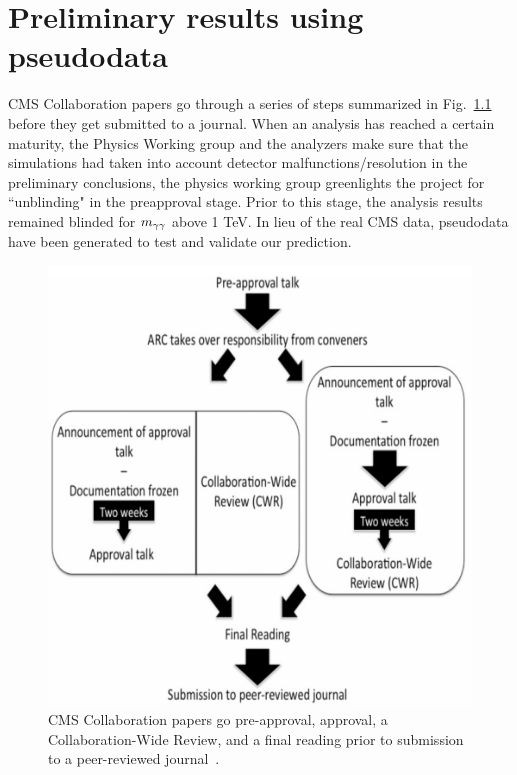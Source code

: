\chapter{Preliminary results using pseudodata}\label{ch:appendix_pseudodata}
\begin{spacing}{2}
CMS Collaboration papers go through a series of steps summarized in Fig.~\ref{Fig:CMSPubJourney} before they get submitted to a journal. 
When an analysis has reached a certain maturity, the Physics Working group and the analyzers make sure that the simulations had taken into account detector malfunctions/resolution in the preliminary conclusions, the physics working group greenlights the project for ``unblinding" in the preapproval stage. Prior to this stage, the analysis results remained blinded for $m_{\gamma\gamma}$ above 1 TeV. In lieu of the real CMS data, pseudodata have been generated to test and validate our prediction. 

\begin{figure}[h!]\centering
\includegraphics[scale=0.7]{fig/CMSPublication.png}
\caption{CMS Collaboration papers go pre-approval, approval, a Collaboration-Wide Review, and a final reading prior to submission to a peer-reviewed journal~\cite{CMSPublishing}.}
\label{Fig:CMSPubJourney}
\end{figure}



\end{spacing}
